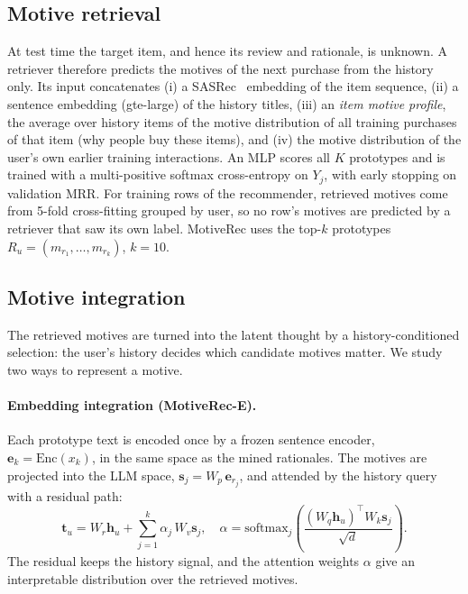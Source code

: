\documentclass[10pt,twocolumn]{article}
\newcommand{\thought}{\mathbf{t}}
\begin{document}
\subsection{Motive retrieval}\label{sec:retrieval}
At test time the target item, and hence its review and rationale, is unknown. A retriever therefore
predicts the motives of the next purchase from the history only. Its input concatenates
(i) a SASRec~\citep{sasrec} embedding of the item sequence, (ii) a sentence embedding (gte-large) of the
history titles, (iii) an \emph{item motive profile}, the average over history items of the motive
distribution of all training purchases of that item (why people buy these items), and (iv) the motive
distribution of the user's own earlier training interactions. An MLP scores all $K$ prototypes and is
trained with a multi-positive softmax cross-entropy on $Y_j$, with early stopping on validation MRR.
For training rows of the recommender, retrieved motives come from 5-fold cross-fitting grouped by user, so
no row's motives are predicted by a retriever that saw its own label. MotiveRec uses the top-$k$
prototypes $R_u=(m_{r_1},\dots,m_{r_k})$, $k=10$.

\subsection{Motive integration}\label{sec:integration}
The retrieved motives are turned into the latent thought by a history-conditioned selection: the
user's history decides which candidate motives matter. We study two ways to represent a motive.

\paragraph{Embedding integration (MotiveRec-E).} Each prototype text is encoded once by a frozen
sentence encoder, $\mathbf{e}_k=\mathrm{Enc}(x_k)$, in the same space as the mined rationales. The motives
are projected into the LLM space, $\mathbf{s}_j=W_p\,\mathbf{e}_{r_j}$, and attended by the history
query with a residual path:
\begin{equation}
\thought_u = W_r\mathbf{h}_u + \sum_{j=1}^{k}\alpha_j\,W_v\mathbf{s}_j,\quad
\alpha=\mathrm{softmax}_j\!\left(\frac{(W_q\mathbf{h}_u)^{\top}W_k\mathbf{s}_j}{\sqrt d}\right).
\end{equation}
The residual keeps the history signal, and the attention weights $\alpha$ give an interpretable
distribution over the retrieved motives.
\end{document}
